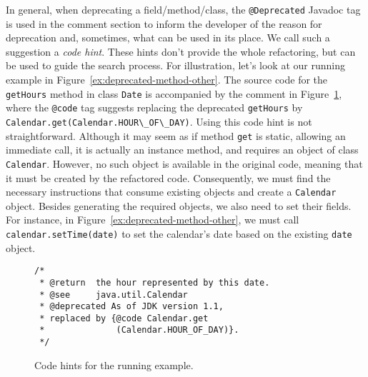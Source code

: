\documentclass[sigconf,review,anonymous]{acmart}
\begin{document}
In general, when deprecating a field/method/class, the \lstinline[breaklines=true]{@Deprecated} Javadoc tag is used in the
comment section to inform the developer of the reason for deprecation and, sometimes, what can be used in its place. We call such a suggestion a {\em code hint}.
These hints don't provide the whole refactoring, but can be used to guide the search process.
%
For illustration, let's look at our running example in
Figure~\ref{ex:deprecated-method-other}.  The source code for the
\lstinline[breaklines=true]{getHours} method in class \lstinline[breaklines=true]{Date} is accompanied by the
comment in Figure~\ref{ex:code-hints}, where the \lstinline[breaklines=true]{@code} tag suggests
replacing the deprecated \lstinline[breaklines=true]{getHours} by
\lstinline[breaklines=true]{Calendar.get(Calendar.HOUR\_OF\_DAY)}.
%
Using this code hint is not straightforward.
Although it may seem as if
method \lstinline[breaklines=true]{get} is static, allowing an immediate call,
it is actually an instance method, and requires an object of
class \lstinline[breaklines=true]{Calendar}. However, no such object is available in the
original code, meaning that it must be created by the refactored code.
Consequently, we must find the necessary
instructions that consume existing objects and create a \lstinline[breaklines=true]{Calendar} object.
Besides generating the required objects, we also need to set their
fields. For instance,
in Figure~\ref{ex:deprecated-method-other}, we must call
\lstinline[breaklines=true]{calendar.setTime(date)} to set the calendar's date
based on the existing \lstinline[breaklines=true]{date} object.


\begin{figure}
\begin{lstlisting}[mathescape=true,showstringspaces=false]
/*
 * @return  the hour represented by this date.
 * @see     java.util.Calendar
 * @deprecated As of JDK version 1.1,
 * replaced by {@code Calendar.get
 *              (Calendar.HOUR_OF_DAY)}.
 */  
\end{lstlisting}
\caption{Code hints for the running example.}
\label{ex:code-hints}
\end{figure}



\end{document}
